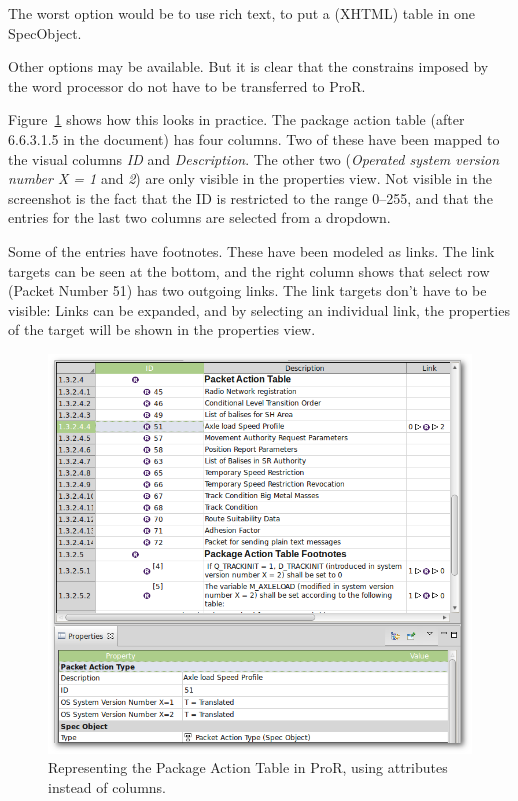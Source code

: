 \documentclass{template/openetcs_report}
\begin{document}
The worst option would be to use rich text, to put a (XHTML) table in one SpecObject.

Other options may be available.  But it is clear that the constrains imposed by the word processor do not have to be transferred to ProR.

Figure~\ref{fig:packet-action-table} shows how this looks in practice.  The package action table (after 6.6.3.1.5 in the document) has four columns.  Two of these have been mapped to the visual columns \emph{ID} and \emph{Description}.  The other two (\emph{Operated system version number X = 1} and \emph{2}) are only visible in the properties view.  Not visible in the screenshot is the fact that the ID is restricted to the range 0--255, and that the entries for the last two columns are selected from a dropdown.

Some of the entries have footnotes.  These have been modeled as links.  The link targets can be seen at the bottom, and the right column shows that select row (Packet Number 51) has two outgoing links.  The link targets don't have to be visible: Links can be expanded, and by selecting an individual link, the properties of the target will be shown in the properties view.

\begin{figure}
	\begin{center}
	\includegraphics[width=.8\textwidth]{img/packet-action-table.png}
	\end{center}
	\caption{Representing the Package Action Table in ProR, using attributes instead of columns.}
	\label{fig:packet-action-table}
\end{figure}
\end{document}
